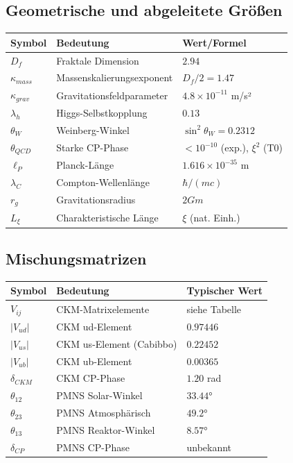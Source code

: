 \documentclass[12pt,a4paper]{article}
\begin{document}
\subsection{Geometrische und abgeleitete Größen}
\begin{longtable}{lll}
	\toprule
	\textbf{Symbol} & \textbf{Bedeutung} & \textbf{Wert/Formel} \\
	\midrule
	$D_f$ & Fraktale Dimension & $2.94$ \\
	$\kappa_{mass}$ & Massenskalierungsexponent & $D_f/2 = 1.47$ \\
	$\kappa_{grav}$ & Gravitationsfeldparameter & $4.8 \times 10^{-11}$ m/s² \\
	$\lambda_h$ & Higgs-Selbstkopplung & $0.13$ \\
	$\theta_W$ & Weinberg-Winkel & $\sin^2\theta_W = 0.2312$ \\
	$\theta_{QCD}$ & Starke CP-Phase & $< 10^{-10}$ (exp.), $\xi^2$ (T0) \\
	$\ell_P$ & Planck-Länge & $1.616 \times 10^{-35}$ m \\
	$\lambda_C$ & Compton-Wellenlänge & $\hbar/(mc)$ \\
	$r_g$ & Gravitationsradius & $2Gm$ \\
	$L_\xi$ & Charakteristische Länge & $\xi$ (nat. Einh.) \\
	\bottomrule
\end{longtable}

\subsection{Mischungsmatrizen}
\begin{longtable}{lll}
	\toprule
	\textbf{Symbol} & \textbf{Bedeutung} & \textbf{Typischer Wert} \\
	\midrule
	$V_{ij}$ & CKM-Matrixelemente & siehe Tabelle \\
	$|V_{ud}|$ & CKM ud-Element & $0.97446$ \\
	$|V_{us}|$ & CKM us-Element (Cabibbo) & $0.22452$ \\
	$|V_{ub}|$ & CKM ub-Element & $0.00365$ \\
	$\delta_{CKM}$ & CKM CP-Phase & $1.20$ rad \\
	$\theta_{12}$ & PMNS Solar-Winkel & $33.44°$ \\
	$\theta_{23}$ & PMNS Atmosphärisch & $49.2°$ \\
	$\theta_{13}$ & PMNS Reaktor-Winkel & $8.57°$ \\
	$\delta_{CP}$ & PMNS CP-Phase & unbekannt \\
	\bottomrule
\end{longtable}
\end{document}
